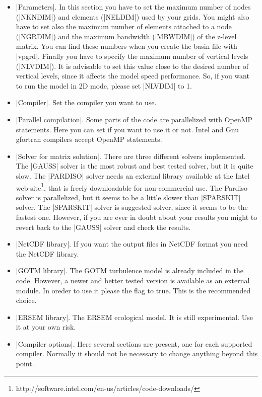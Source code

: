 \begin{itemize}
\item |Parameters|. In this section you have to set the
maximum number of nodes (|NKNDIM|) and elements (|NELDIM|)
used by your grids. You might also have to set also the maximum number 
of elements attached to
a node (|NGRDIM|) and the maximum bandwidth (|MBWDIM|) of the
z-level matrix. You can find these numbers when you create the basin file
with |vpgrd|. Finally you have to specify
the maximum number of vertical levels (|NLVDIM|).
It is advisable to set this value close to the desired number of
vertical levels, since it affects the model speed performance. So, if
you want to run the model in 2D mode, please set |NLVDIM| to 1.
\item |Compiler|. Set the compiler you want to use.
\item |Parallel compilation|. Some parts of the code are parallelized
with OpenMP statements. Here you can set if you want to use it or not.
Intel and Gnu gfortran compilers accept OpenMP statements.
\item |Solver for matrix solution|. There are three different solvers
implemented. 
The |GAUSS| solver is the most robust and best tested solver,
but it is quite slow. The |PARDISO| solver needs an
external library available at the Intel 
web-site\footnote{http://software.intel.com/en-us/articles/code-downloads/},
that is freely downloadable for non-commercial use. 
The Pardiso solver is parallelized,
but it seems to be a little slower than |SPARSKIT| solver.
The |SPARSKIT| solver is suggested solver, since it seems to be the 
fastest one. However, if you are ever in doubt about your results you might
to revert back to the |GAUSS| solver and check the results.
\item |NetCDF library|. If you want the output files in NetCDF format
you need the NetCDF library.
\item |GOTM library|. The GOTM turbulence model is already included
in the code. However, a newer and better tested version is available as
an external module. In oreder to use it please
the flag to true. This is the recommended choice.
\item |ERSEM library|. The ERSEM ecological model. 
It is still experimental. Use it at your own risk.
\item |Compiler options|. Here several sections are present, 
one for each supported compiler. Normally it should not be necessary to 
change anything beyond this point.
\end{itemize}

